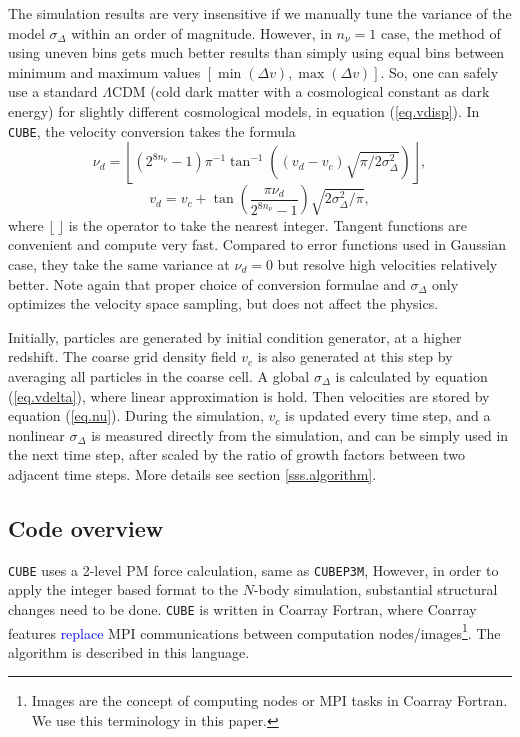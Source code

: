 \documentclass[10pt,twocolumn,preprint]{emulateapj}
\newcommand{\tcb}{\textcolor{blue}}
\begin{document}
The simulation results are very insensitive if we manually tune the variance of the model $\sigma_\Delta$ within an order of magnitude. However, in $n_\nu=1$ case, the method of using uneven bins gets much better results than simply using equal bins between minimum and maximum values $[\min(\Delta v),\max(\Delta v)]$. So, one can safely use a standard $\Lambda$CDM (cold dark matter with a cosmological constant as dark energy) for slightly different cosmological models, in equation (\ref{eq.vdisp}). In {\tt CUBE}, the velocity conversion takes the formula
\begin{equation}\label{eq.nu}
	\nu_d=\left\lfloor(2^{8n_\nu}-1)\pi^{-1}\tan^{-1}\left((v_d-v_c)\sqrt{\pi/2\sigma_\Delta^2}\right)\right\rfloor,
\end{equation}
\begin{equation}\label{eq.v}
	v_d=v_c+\tan\left(\frac{\pi\nu_d}{2^{8n_\nu}-1}\right)\sqrt{2\sigma_\Delta^2/\pi},
\end{equation}
where $\lfloor\ \rfloor$ is the operator to take the nearest integer. Tangent functions are convenient and compute very fast. Compared to error functions used in Gaussian case, they take the same variance at $\nu_d=0$ but resolve high velocities relatively better. Note again that proper choice of conversion formulae and $\sigma_\Delta$ only optimizes the velocity space sampling, but does not affect the physics. 

Initially, particles are generated by initial condition generator, at a higher redshift. The coarse grid density field $v_c$ is also generated at this step by averaging all particles in the coarse cell. A global $\sigma_\Delta$ is calculated by equation (\ref{eq.vdelta}), where linear approximation is hold. Then velocities are stored by equation (\ref{eq.nu}). During the simulation, $v_c$ is updated every time step, and a nonlinear $\sigma_\Delta$ is measured directly from the simulation, and can be simply used in the next time step, after scaled by the ratio of growth factors between two adjacent time steps. More details see section \ref{sss.algorithm}.

\subsection{Code overview}\label{ss.overview}
{\tt CUBE} uses a 2-level PM force calculation, same as {\tt CUBEP3M}, However, in order to apply the integer based format to the $N$-body simulation, substantial structural changes need to be done. {\tt CUBE} is written in Coarray Fortran, where Coarray features \tcb{replace} MPI communications between computation nodes/images\footnote{Images are the concept of computing nodes or MPI tasks in Coarray Fortran. We use this terminology in this paper.}. The algorithm is described in this language. 
\end{document}
